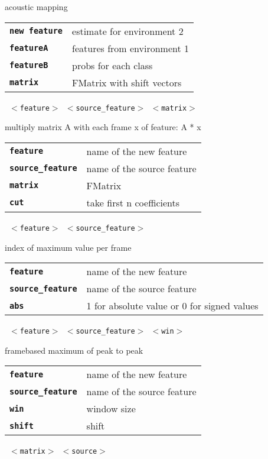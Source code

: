 \begin{description}
\begin{description}
        acoustic mapping

      \begin{tabular}{ll}
 \texttt{\textbf{new feature}} &  estimate for environment 2 \\
 \texttt{\textbf{featureA}} &     features from environment 1 \\
 \texttt{\textbf{featureB}} &     probs for each class \\
 \texttt{\textbf{matrix}} &       FMatrix with shift vectors \\
      \end{tabular}
       \texttt{ $<$feature$>$ $<$source\_feature$>$ $<$matrix$>$ } \

        multiply matrix A with each frame x of feature: A * x

      \begin{tabular}{ll}
 \texttt{\textbf{feature}} &         name of the new feature \\
 \texttt{\textbf{source\_feature}} &  name of the source feature \\
 \texttt{\textbf{matrix}} &          FMatrix \\
 \texttt{\textbf{cut}} &              take first n coefficients  \\
      \end{tabular}
       \texttt{ $<$feature$>$ $<$source\_feature$>$ } \

        index of maximum value per frame

      \begin{tabular}{ll}
 \texttt{\textbf{feature}} &         name of the new feature \\
 \texttt{\textbf{source\_feature}} &  name of the source feature \\
 \texttt{\textbf{abs}} &              1 for absolute value or 0 for signed values  \\
      \end{tabular}
       \texttt{ $<$feature$>$ $<$source\_feature$>$ $<$win$>$ } \

        framebased maximum of peak to peak

      \begin{tabular}{ll}
 \texttt{\textbf{feature}} &         name of the new feature \\
 \texttt{\textbf{source\_feature}} &  name of the source feature \\
 \texttt{\textbf{win}} &             window size  \\
 \texttt{\textbf{shift}} &            shift  \\
      \end{tabular}
       \texttt{ $<$matrix$>$ $<$source$>$     } \


\end{description}
\end{description}
